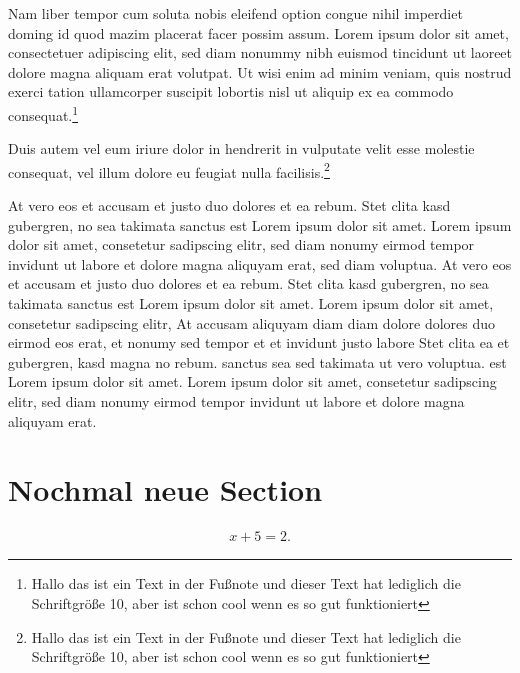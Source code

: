 \documentclass[\mainsize, a4paper, fleqn, xcolor=dvipsnames]{scrartcl}
\begin{document}
Nam liber tempor cum soluta nobis eleifend option congue nihil imperdiet doming id quod mazim placerat facer possim assum. Lorem ipsum dolor sit amet, consectetuer adipiscing elit, sed diam nonummy nibh euismod tincidunt ut laoreet dolore magna aliquam erat volutpat. Ut wisi enim ad minim veniam, quis nostrud exerci tation ullamcorper suscipit lobortis nisl ut aliquip ex ea commodo consequat.\footnote{Hallo das ist ein Text in der Fußnote und dieser Text hat lediglich die Schriftgröße 10, aber ist schon cool wenn es so gut funktioniert}
  
Duis autem vel eum iriure dolor in hendrerit in vulputate velit esse molestie consequat, vel illum dolore eu feugiat nulla facilisis.\footnote{Hallo das ist ein Text in der Fußnote und dieser Text hat lediglich die Schriftgröße 10, aber ist schon cool wenn es so gut funktioniert}
  
At vero eos et accusam et justo duo dolores et ea rebum. Stet clita kasd gubergren, no sea takimata sanctus est Lorem ipsum dolor sit amet. Lorem ipsum dolor sit amet, consetetur sadipscing elitr, sed diam nonumy eirmod tempor invidunt ut labore et dolore magna aliquyam erat, sed diam voluptua. At vero eos et accusam et justo duo dolores et ea rebum. Stet clita kasd gubergren, no sea takimata sanctus est Lorem ipsum dolor sit amet. Lorem ipsum dolor sit amet, consetetur sadipscing elitr, At accusam aliquyam diam diam dolore dolores duo eirmod eos erat, et nonumy sed tempor et et invidunt justo labore Stet clita ea et gubergren, kasd magna no rebum. sanctus sea sed takimata ut vero voluptua. est Lorem ipsum dolor sit amet. Lorem ipsum dolor sit amet, consetetur sadipscing elitr, sed diam nonumy eirmod tempor invidunt ut labore et dolore magna aliquyam erat.

\section{Nochmal neue Section}

\begin{align}
	x+5=2.
\end{align}


	
\end{document}
